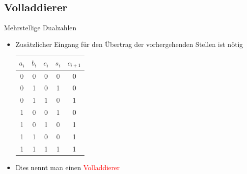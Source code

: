 \documentclass[12pt%
,xcolor=table
,aspectratio=169%
]{beamer}
\begin{document}
\subsection{Volladdierer}
\begin{frame}{Mehrstellige Dualzahlen}
\begin{itemize}
	\item Zusätzlicher Eingang für den Übertrag der vorhergehenden Stellen ist nötig
	\begin{table}[]
	\begin{tabular}{ccc|cc}
$a_i$ & $b_i$ & $c_i$ & $s_i$ & $c_{i+1}$ \\ \hline
0 & 0 & 0 & 0 & 0 \\
0 & 1 & 0 & 1 & 0 \\
0 & 1 & 1 & 0 & 1 \\
1 & 0 & 0 & 1 & 0 \\
1 & 0 & 1 & 0 & 1 \\
1 & 1 & 0 & 0 & 1 \\
1 & 1 & 1 & 1 & 1 \\
\end{tabular}
\end{table}
	\item Dies nennt man einen \textcolor{red}{Volladdierer}
\end{itemize}
\end{frame}
\end{document}
